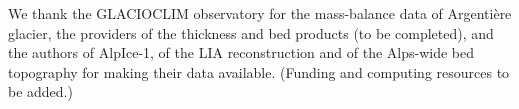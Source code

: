 \documentclass[tc, manuscript]{copernicus}
\begin{document}
\noappendix



\begin{acknowledgements}
We thank the GLACIOCLIM observatory for the mass-balance data of Argenti\`ere glacier, the providers of the thickness and bed products (to be completed), and the authors of AlpIce-1, of the LIA reconstruction and of the Alps-wide bed topography for making their data available. (Funding and computing resources to be added.)
\end{acknowledgements}




\end{document}
